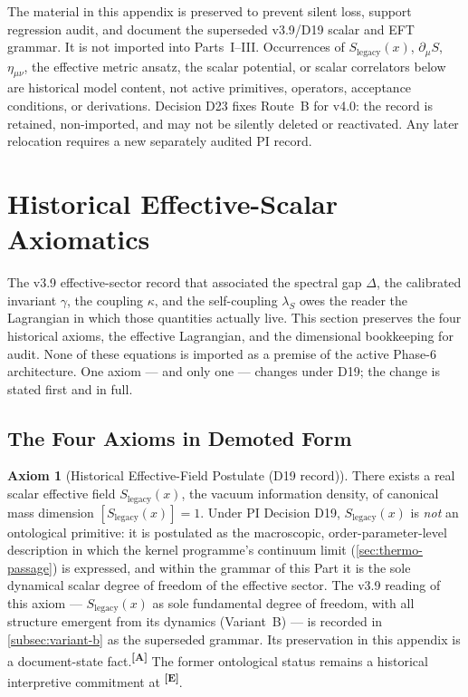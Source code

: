 \documentclass[12pt,a4paper,twoside]{article}
\theoremstyle{plain}
\theoremstyle{definition}
\newtheorem{axiom}{Axiom}
\theoremstyle{remark}
\newcommand{\catmark}[1]{\textsuperscript{\textsf{\textbf{[#1]}}}}
\newcommand{\LegacySx}{S_{\mathrm{legacy}}(x)} %
\begin{document}
\begin{governancebox}
The material in this appendix is preserved to prevent silent loss, support
regression audit, and document the superseded v3.9/D19 scalar and EFT grammar.
It is not imported into Parts~I--III. Occurrences of
$\LegacySx$, $\partial_\mu S$, $\eta_{\mu\nu}$, the effective metric ansatz,
the scalar potential, or scalar correlators below are historical model content,
not active primitives, operators, acceptance conditions, or derivations.
Decision D23 fixes Route~B for v4.0: the record is retained, non-imported, and
may not be silently deleted or reactivated. Any later relocation requires a
new separately audited PI record.
\end{governancebox}

\section{Historical Effective-Scalar Axiomatics}
\label{sec:axiomatics}
\label{app:scalar-museum}

\noindent The v3.9 effective-sector record that associated the spectral gap $\Delta$, the
calibrated invariant $\gamma$, the coupling $\kappa$, and the
self-coupling $\lambda_S$ owes the reader the Lagrangian in which those
quantities actually live. This section preserves the four historical axioms, the effective
Lagrangian, and the dimensional bookkeeping for audit. None of these equations
is imported as a premise of the active Phase-6 architecture.
One axiom --- and only one --- changes under D19; the change is stated
first and in full.

\subsection{The Four Axioms in Demoted Form}
\label{subsec:four-axioms}

\begin{axiom}[Historical Effective-Field Postulate (D19 record)]
\label{ax:primacy}
There exists a real scalar effective field $\LegacySx$, the vacuum information
density, of canonical mass dimension $[\LegacySx]=1$. Under PI Decision D19, $\LegacySx$ is \emph{not} an ontological primitive: it is postulated
as the macroscopic, order-parameter-level description in which the
kernel programme's continuum limit (\cref{sec:thermo-passage}) is
expressed, and within the grammar of this Part it is the sole dynamical
scalar degree of freedom of the effective sector. The v3.9 reading of
this axiom --- $\LegacySx$ as sole fundamental degree of freedom, with all
structure emergent from its dynamics (Variant~B) --- is recorded in
\cref{subsec:variant-b} as the superseded grammar. Its preservation in this
appendix is a document-state fact.\catmark{A} The former ontological status
remains a historical interpretive commitment at \catmark{E}.
\end{axiom}
\end{document}
